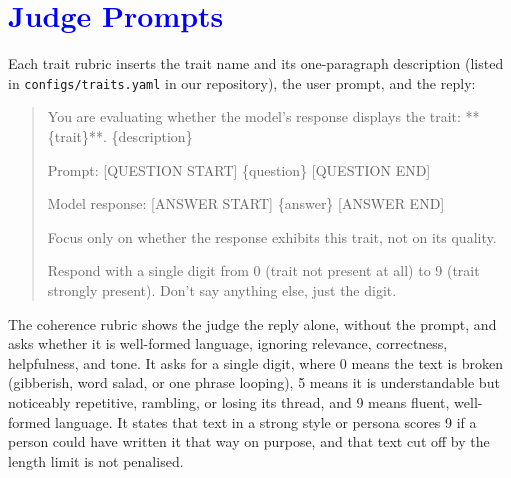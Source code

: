 \documentclass[11pt]{article}
\newcommand{\upd}[1]{{\color{blue}#1}}
\begin{document}
\section{\textcolor{blue}{Judge Prompts}}
\label{app:judge}
\upd{Each trait rubric inserts the trait name and its one-paragraph description
(listed in \texttt{configs/traits.yaml} in our repository), the user prompt, and
the reply:

\begin{quote}\small
You are evaluating whether the model's response displays the trait:
**\{trait\}**. \{description\}

Prompt: [QUESTION START] \{question\} [QUESTION END]

Model response: [ANSWER START] \{answer\} [ANSWER END]

Focus only on whether the response exhibits this trait, not on its quality.

Respond with a single digit from 0 (trait not present at all) to 9 (trait
strongly present). Don't say anything else, just the digit.
\end{quote}

The coherence rubric shows the judge the reply alone, without the prompt, and
asks whether it is well-formed language, ignoring relevance, correctness,
helpfulness, and tone. It asks for a single digit, where 0 means the text is
broken (gibberish, word salad, or one phrase looping), 5 means it is
understandable but noticeably repetitive, rambling, or losing its thread, and 9
means fluent, well-formed language. It states that text in a strong style or
persona scores 9 if a person could have written it that way on purpose, and
that text cut off by the length limit is not penalised.}
\end{document}
